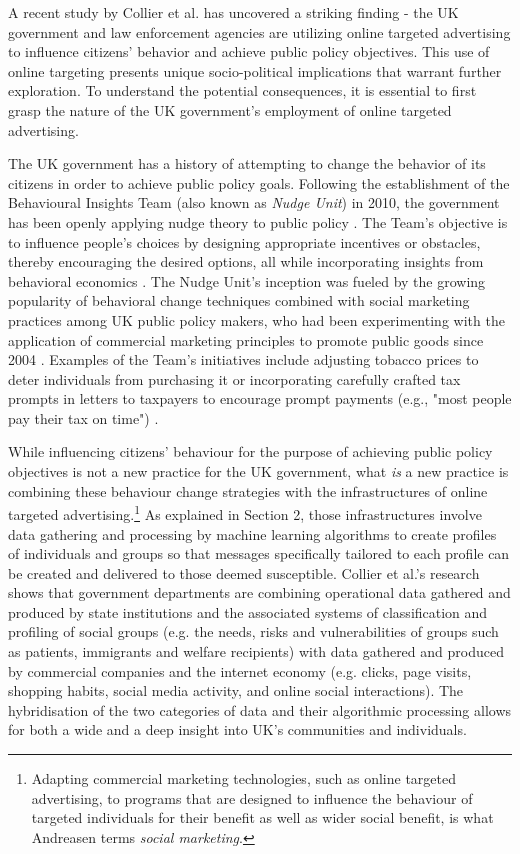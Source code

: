 \documentclass[preprint]{acmart}
\begin{document}
A recent study by Collier et al. \cite{Collier2022} has uncovered a striking finding - the UK government and law enforcement agencies are utilizing online targeted advertising to influence citizens' behavior and achieve public policy objectives. This use of online targeting presents unique socio-political implications that warrant further exploration. To understand the potential consequences, it is essential to first grasp the nature of the UK government's employment of online targeted advertising.


The UK government has a history of attempting to change the behavior of its citizens in order to achieve public policy goals. Following the establishment of the Behavioural Insights Team (also known as \textit{Nudge Unit}) in 2010, the government has been openly applying nudge theory to public policy \cite{Collier2022}. The Team's objective is to influence people's choices by designing appropriate incentives or obstacles, thereby encouraging the desired options, all while incorporating insights from behavioral economics \cite{Halpern2017}. The Nudge Unit's inception was fueled by the growing popularity of behavioral change techniques combined with social marketing practices among UK public policy makers, who had been experimenting with the application of commercial marketing principles to promote public goods since 2004 \cite{pykett}. Examples of the Team's initiatives include adjusting tobacco prices to deter individuals from purchasing it or incorporating carefully crafted tax prompts in letters to taxpayers to encourage prompt payments (e.g., "most people pay their tax on time") \cite{Halpern2017}.


While influencing citizens' behaviour for the purpose of achieving public policy objectives is not a new practice for the UK government, what \textit{is} a new practice is combining these behaviour change strategies with the infrastructures of online targeted advertising.\footnote{Adapting commercial marketing technologies, such as online targeted advertising, to programs that are designed to influence the behaviour of targeted individuals for their benefit as well as wider social benefit, is what Andreasen \cite{andreasen} terms \textit{social marketing}.} As explained in Section 2, those infrastructures involve data gathering and processing by machine learning algorithms to create profiles of individuals and groups so that messages specifically tailored to each profile can be created and delivered to those deemed susceptible. Collier et al.'s research \cite{Collier2022} shows that government departments are combining operational data gathered and produced by state institutions and the associated systems of classification and profiling of social groups (e.g. the needs, risks and vulnerabilities of groups such as patients, immigrants and welfare recipients) with data gathered and produced by commercial companies and the internet economy (e.g. clicks, page visits, shopping habits, social media activity, and online social interactions). The hybridisation of the two categories of data and their algorithmic processing allows for both a wide and a deep insight into UK's communities and individuals.
\end{document}
